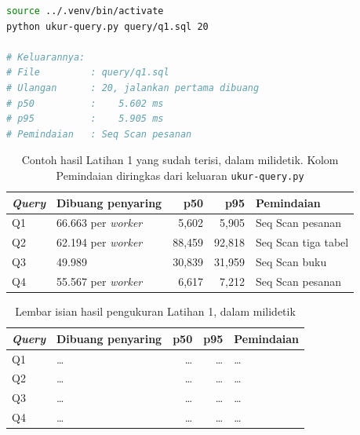 \begin{lstlisting}[language=bash, caption={Mengukur sebaran waktu eksekusi satu query, tersedia di \berkas{sources/chapter03/ukur-query.py}}, label={lst:c3-lat1-jalan}]
source ../.venv/bin/activate
python ukur-query.py query/q1.sql 20

# Keluarannya:
# File         : query/q1.sql
# Ulangan      : 20, jalankan pertama dibuang
# p50          :    5.602 ms
# p95          :    5.905 ms
# Pemindaian   : Seq Scan pesanan
\end{lstlisting}

\begin{table}[!htb]
  \centering
  \caption{Contoh hasil Latihan 1 yang sudah terisi, dalam milidetik. Kolom Pemindaian diringkas dari keluaran \texttt{ukur-query.py}}
  \label{tab:c3-lat1-contoh}
  \begin{tabularx}{\textwidth}{lXrrl}
    \hline
    \textbf{\textit{Query}} & \textbf{Dibuang penyaring} & \textbf{p50} & \textbf{p95} & \textbf{Pemindaian} \\
    \hline
    Q1 & 66.663 per \textit{worker} & 5,602 & 5,905 & Seq Scan pesanan \\
    \hline
    Q2 & 62.194 per \textit{worker} & 88,459 & 92,818 & Seq Scan tiga tabel \\
    \hline
    Q3 & 49.989 & 30,839 & 31,959 & Seq Scan buku \\
    \hline
    Q4 & 55.567 per \textit{worker} & 6,617 & 7,212 & Seq Scan pesanan \\
    \hline
  \end{tabularx}
\end{table}

\begin{table}[!htb]
  \centering
  \caption{Lembar isian hasil pengukuran Latihan 1, dalam milidetik}
  \label{tab:c3-lat1-hasil}
  \begin{tabularx}{\textwidth}{lXrrl}
    \hline
    \textbf{\textit{Query}} & \textbf{Dibuang penyaring} & \textbf{p50} & \textbf{p95} & \textbf{Pemindaian} \\
    \hline
    Q1 & \dots & \dots & \dots & \dots \\
    \hline
    Q2 & \dots & \dots & \dots & \dots \\
    \hline
    Q3 & \dots & \dots & \dots & \dots \\
    \hline
    Q4 & \dots & \dots & \dots & \dots \\
    \hline
  \end{tabularx}
\end{table}

